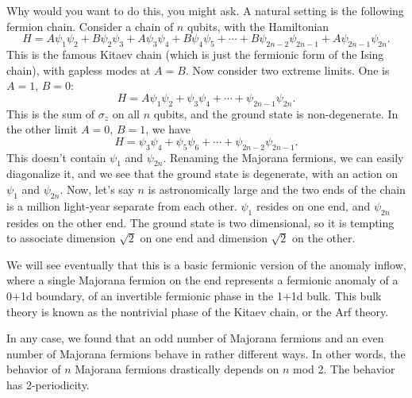 \documentclass[12pt]{article}
\numberwithin{equation}{section}
\numberwithin{figure}{section}
\theoremstyle{remark}
\begin{document}
Why would you want to do this, you might ask. A natural setting is the following fermion chain.
Consider a chain of $n$ qubits, with the Hamiltonian \begin{equation}
H= A \psi_1 \psi_2 + B \psi_2\psi_3 + A \psi_3\psi_4 + B \psi_4\psi_5 + \cdots
+B\psi_{2n-2}\psi_{2n-1}+ A\psi_{2n-1} \psi_{2n}.
\end{equation}
This is the famous Kitaev chain (which is just the fermionic form of the Ising chain), 
with gapless modes at $A=B$.
Now consider two extreme limits. One is $A=1$, $B=0$: \begin{equation}
H=A \psi_1 \psi_2  +   \psi_3\psi_4  + \cdots + \psi_{2n-1} \psi_{2n}.
\end{equation}
This is the sum of $\sigma_z$ on all $n$ qubits, and the ground state is non-degenerate.
In the other limit $A=0$, $B=1$, we have \begin{equation}
H= \psi_3 \psi_4  +  \psi_5\psi_6  + \cdots + \psi_{2n-2} \psi_{2n-1}.
\end{equation}
This doesn't contain $\psi_1$ and $\psi_{2n}$.
Renaming the Majorana fermions, we can easily diagonalize it,
and we see that the ground state is degenerate, with an action on $\psi_1$ and $\psi_{2n}$.
Now, let's say $n$ is astronomically large and the two ends of the chain
is a million light-year separate from each other.
$\psi_1$ resides on one end,
and $\psi_{2n}$  resides on the other end. 
The ground state is two dimensional, so it is tempting to associate dimension $\sqrt{2}$ on one end
and dimension $\sqrt{2}$ on the other.

We will see eventually that this is a basic fermionic version of the anomaly inflow,
where a single Majorana fermion on the end represents a fermionic anomaly
of a 0+1d boundary, of an invertible fermionic phase in the 1+1d bulk.
This bulk theory is known as the nontrivial phase of the Kitaev chain,
or the Arf theory.

In any case, we found that an odd number of Majorana fermions
and an even number of Majorana fermions behave in rather different ways.
In other words, the behavior of $n$ Majorana fermions 
drastically depends on $n$ mod 2.
The behavior has 2-periodicity.
\end{document}

